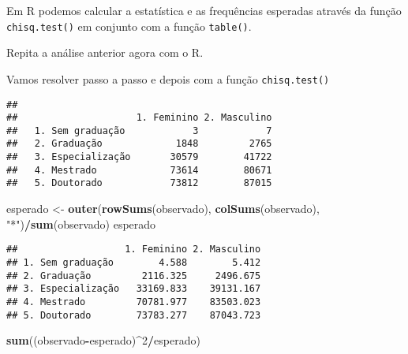 \documentclass[11pt,]{style/krantz}
\makeatletter
\newenvironment{Shaded}{\begin{snugshade}}{\end{snugshade}}
\newcommand{\CommentTok}[1]{\textcolor[rgb]{0.56,0.35,0.01}{\textit{#1}}}
\newcommand{\DecValTok}[1]{\textcolor[rgb]{0.00,0.00,0.81}{#1}}
\newcommand{\KeywordTok}[1]{\textcolor[rgb]{0.13,0.29,0.53}{\textbf{#1}}}
\newcommand{\NormalTok}[1]{#1}
\newcommand{\OperatorTok}[1]{\textcolor[rgb]{0.81,0.36,0.00}{\textbf{#1}}}
\newcommand{\StringTok}[1]{\textcolor[rgb]{0.31,0.60,0.02}{#1}}
\newenvironment{kframe}{%
\medskip{}
\setlength{\fboxsep}{.8em}
 \def\at@end@of@kframe{}%
 \ifinner\ifhmode%
  \def\at@end@of@kframe{\end{minipage}}%
  \begin{minipage}{\columnwidth}%
 \fi\fi%
 \def\FrameCommand##1{\hskip\@totalleftmargin \hskip-\fboxsep
 \colorbox{shadecolor}{##1}\hskip-\fboxsep
     \hskip-\linewidth \hskip-\@totalleftmargin \hskip\columnwidth}%
 \MakeFramed {\advance\hsize-\width
   \@totalleftmargin\z@ \linewidth\hsize
   \@setminipage}}%
 {\par\unskip\endMakeFramed%
 \at@end@of@kframe}
\renewenvironment{Shaded}{\begin{kframe}}{\end{kframe}}
\theoremstyle{definition}
\theoremstyle{definition}
\theoremstyle{definition}
\theoremstyle{remark}
\let\BeginKnitrBlock\begin \let\EndKnitrBlock\end
\makeatother
\begin{document}
Em R podemos calcular a estatística e as frequências esperadas através da função \texttt{chisq.test()} em conjunto com a função \texttt{table()}.

\BeginKnitrBlock{example}
\protect\hypertarget{exm:unnamed-chunk-91}{}{\label{exm:unnamed-chunk-91} }Repita a análise anterior agora com o R.
\EndKnitrBlock{example}

\BeginKnitrBlock{solution}
\iffalse{} {Solução. } \fi{}Vamos resolver passo a passo e depois com a função \texttt{chisq.test()}
\EndKnitrBlock{solution}

\begin{Shaded}
\end{Shaded}

\begin{verbatim}
##
##                     1. Feminino 2. Masculino
##   1. Sem graduação            3            7
##   2. Graduação             1848         2765
##   3. Especialização       30579        41722
##   4. Mestrado             73614        80671
##   5. Doutorado            73812        87015
\end{verbatim}

\begin{Shaded}
\begin{Highlighting}[]
\NormalTok{esperado  <-}\StringTok{ }\KeywordTok{outer}\NormalTok{(}\KeywordTok{rowSums}\NormalTok{(observado), }\KeywordTok{colSums}\NormalTok{(observado), }\StringTok{"*"}\NormalTok{)}\OperatorTok{/}\KeywordTok{sum}\NormalTok{(observado)}
\NormalTok{esperado}
\end{Highlighting}
\end{Shaded}

\begin{verbatim}
##                   1. Feminino 2. Masculino
## 1. Sem graduação        4.588        5.412
## 2. Graduação         2116.325     2496.675
## 3. Especialização   33169.833    39131.167
## 4. Mestrado         70781.977    83503.023
## 5. Doutorado        73783.277    87043.723
\end{verbatim}

\begin{Shaded}
\begin{Highlighting}[]
\KeywordTok{sum}\NormalTok{((observado}\OperatorTok{-}\NormalTok{esperado)}\OperatorTok{^}\DecValTok{2}\OperatorTok{/}\NormalTok{esperado)}
\end{Highlighting}
\end{Shaded}
\end{document}

